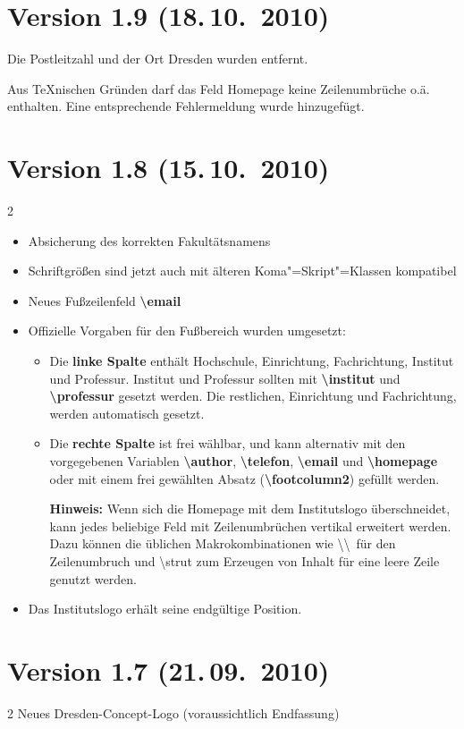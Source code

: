 \documentclass[a0paper,noDIN,MathematikA0]{tudmathposter}
\begin{document}
\section{Version 1.9 (18.\,10.~2010)}
Die Postleitzahl und der Ort Dresden wurden entfernt.

Aus \TeX nischen Gründen darf das Feld Homepage keine Zeilenumbrüche o.ä. enthalten. Eine entsprechende Fehlermeldung wurde hinzugefügt.
\section{Version 1.8 (15.\,10.~2010)}
\begin{multicols}2
\begin{itemize}
\item Absicherung des korrekten Fakultätsnamens
\item Schriftgrößen sind jetzt auch mit älteren Koma"=Skript"=Klassen kompatibel
\item Neues Fußzeilenfeld \textbf{\textbackslash email}
\item Offizielle Vorgaben für den Fußbereich wurden umgesetzt:
	\begin{itemize}
	\item 	Die \textbf{linke Spalte} enthält Hochschule, Einrichtung, Fachrichtung, Institut und 		Professur. 
		Institut und Professur sollten mit \textbf{\textbackslash institut} und 		\textbf{\textbackslash professur} gesetzt werden. Die restlichen, Einrichtung und 		Fachrichtung, werden automatisch gesetzt.
	\item 	Die \textbf{rechte Spalte} ist frei wählbar, und kann alternativ mit den vorgegebenen Variablen \textbf{\textbackslash author}, \textbf{\textbackslash telefon}, \textbf{\textbackslash email} und \textbf{\textbackslash homepage} oder mit einem frei gewählten Absatz (\textbf{\textbackslash footcolumn2}) gefüllt werden.
	
	\textbf{Hinweis:} Wenn sich die Homepage mit dem Institutslogo überschneidet, kann jedes beliebige Feld mit Zeilenumbrüchen vertikal erweitert werden. Dazu können die üblichen Makrokombinationen wie \textbackslash\textbackslash\ für den Zeilenumbruch und \textbackslash strut zum Erzeugen von Inhalt für eine leere Zeile genutzt werden.
	\end{itemize}
	\item Das Institutslogo erhält seine endgültige Position.
\end{itemize}
\end{multicols}
\section{Version 1.7 (21.\,09.~2010)}
\begin{multicols}2
Neues Dresden-Concept-Logo (voraussichtlich Endfassung)
\end{multicols}
\end{document}
